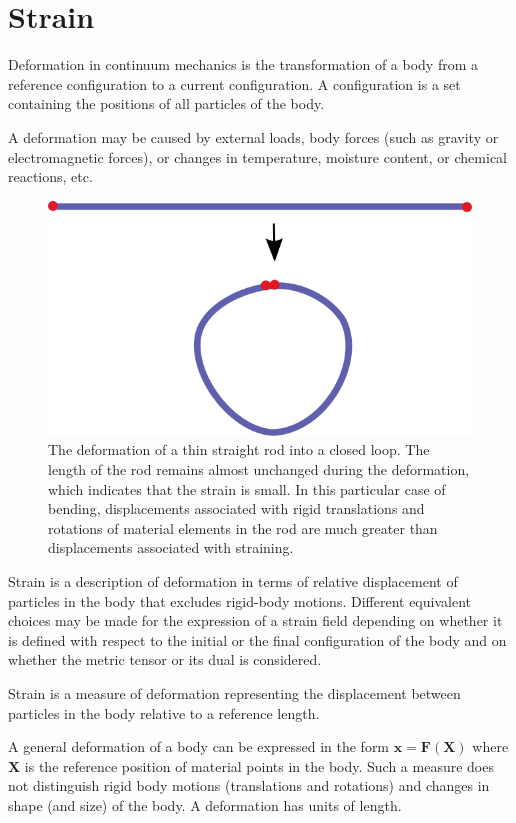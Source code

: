 
\chapter{Strain}

Deformation in continuum mechanics is the transformation of a body from a reference configuration to a current configuration. A configuration is a set containing the positions of all particles of the body.

A deformation may be caused by external loads, body forces (such as gravity or electromagnetic forces), or changes in temperature, moisture content, or chemical reactions, etc.

\begin{figure}[h]
	\centering
	\includegraphics[width=0.7\linewidth]{figures/DeformationOfRod.png}
	\caption{The deformation of a thin straight rod into a closed loop. The length of the rod remains almost unchanged during the deformation, which indicates that the strain is small. In this particular case of bending, displacements associated with rigid translations and rotations of material elements in the rod are much greater than displacements associated with straining.}
	\label{fig:DeformationOfRod}
\end{figure}

Strain is a description of deformation in terms of relative displacement of particles in the body that excludes rigid-body motions. Different equivalent choices may be made for the expression of a strain field depending on whether it is defined with respect to the initial or the final configuration of the body and on whether the metric tensor or its dual is considered.

Strain is a measure of deformation representing the displacement between particles in the body relative to a reference length.

A general deformation of a body can be expressed in the form $ \mathbf{x} = \mathbf{F}(\mathbf{X}) $ where $ \mathbf{X} $ is the reference position of material points in the body. Such a measure does not distinguish rigid body motions (translations and rotations) and changes in shape (and size) of the body. A deformation has units of length.

